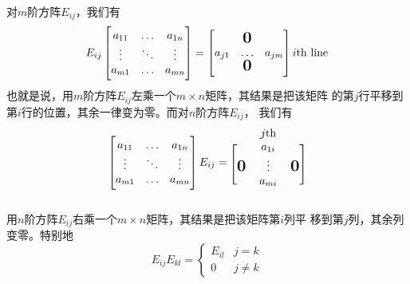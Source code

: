 \documentclass[11pt]{article}
\begin{document}
对\(m\)阶方阵\(E_{ij}\)，我们有
\begin{equation*}
E_{ij}
\begin{bmatrix}
a_{11}&\dots&a_{1n}\\
\vdots&\ddots&\vdots\\
a_{m1}&\dots&a_{mn}\\
\end{bmatrix}=
\begin{bmatrix}
&\mbox{\normalfont\Large\bfseries 0}&\\
a_{j1}&\dots&a_{jm}\\
&\mbox{\normalfont\Large\bfseries 0}&
\end{bmatrix}i\text{th line}
\end{equation*}
也就是说，用\(m\)阶方阵\(E_{ij}\)左乘一个\(m\times n\)矩阵，其结果是把该矩阵
的第\(j\)行平移到第\(i\)行的位置，其余一律变为零。而对\(n\)阶方阵\(E_{ij}\)，
我们有
\begin{equation*}
\begin{bmatrix}
a_{11}&\dots&a_{1n}\\
\vdots&\ddots&\vdots\\
a_{m1}&\dots&a_{mn}\\
\end{bmatrix}E_{ij}=
\begin{blockarray}{ccc}
&j\text{th}&\\
\begin{block}{[ccc]}
&a_{1i}&\\
\bigzero&\vdots&\bigzero\\
&a_{mi}&\\
\end{block}
\end{blockarray}
\end{equation*}

用\(n\)阶方阵\(E_{ij}\)右乘一个\(m\times n\)矩阵，其结果是把该矩阵第\(i\)列平
移到第\(j\)列，其余列变零。特别地
\begin{equation*}
E_{ij}E_{kl}=
\begin{cases}
E_{il}&j=k\\
0&j\neq k
\end{cases}
\end{equation*}
\end{document}
